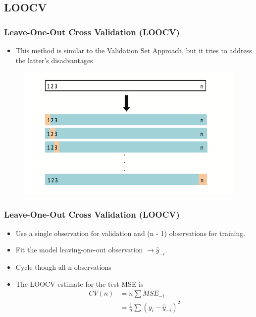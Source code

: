 \documentclass[
  shownotes,
  xcolor={svgnames},
  hyperref={colorlinks,citecolor=DarkBlue,linkcolor=DarkRed,urlcolor=DarkBlue}
  , aspectratio=169]{beamer}
\begin{document}
\subsection{LOOCV}
\begin{frame}[fragile]
\frametitle{Leave-One-Out Cross Validation (LOOCV)}

\begin{itemize}
\item This method is similar to the Validation Set Approach, but it tries to address the latter’s disadvantages 
\end{itemize}

 \begin{figure}[H] \centering
            \captionsetup{justification=centering}
              \includegraphics[scale=0.7]{figures/fig53.png}
       \end{figure}


\end{frame}
\begin{frame}[fragile]
\frametitle{Leave-One-Out Cross Validation (LOOCV)}


\begin{itemize}
\item Use a single observation for validation and (n - 1) observations for training.
\medskip
\item Fit the model leaving-one-out observation $\rightarrow \hat{y}_{-i}$.
\medskip
\item Cycle though all n observations
\medskip
\item The LOOCV estimate for the test MSE is
\begin{align}
CV(n) &= n \sum MSE_{-i} \\ 
      &= \frac{1}{n}\sum(y_i -\hat{y}_{-i})^2
\end{align}
\end{itemize}

\end{frame}
\end{document}
